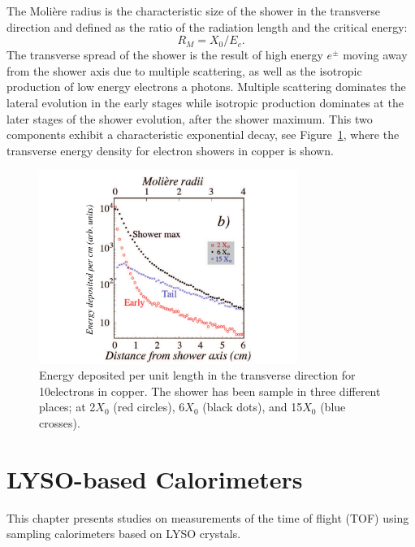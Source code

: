 The Moli\`ere radius is the characteristic size of the shower in the transverse
direction and defined as the ratio
of the radiation length and the critical energy:
\begin{equation}
R_{M} = X_{0}/E_{c}.
\end{equation} 
The transverse spread of the shower is the result of high
energy $e^{\pm}$ moving away from the shower axis due to multiple scattering, as well as the
isotropic production of low energy electrons a photons. Multiple
scattering dominates the lateral evolution in the early stages while
isotropic production dominates at the later stages of the shower
evolution, after the shower maximum. This two components exhibit a
characteristic exponential decay, see
Figure~\ref{fig:transverseProfile}, where the transverse energy density for
electron showers in copper is shown.
\begin{figure}[h] \centering
\includegraphics[width=0.75\textwidth]{calorimetry/ShowerProfile_Right.pdf}
\caption{Energy deposited per unit length in the transverse direction for
10\GeV electrons in copper. The shower has been sample in three
different places; at 2$X_{0}$ (red circles), 6$X_{0}$ (black dots),
and 15$X_{0}$ (blue crosses).}
\label{fig:transverseProfile}
\end{figure}
\clearpage

\chapter{LYSO-based Calorimeters}\label{lyso-cal}
This chapter presents studies on measurements of the time of flight (TOF) using sampling calorimeters 
based on LYSO crystals. 

